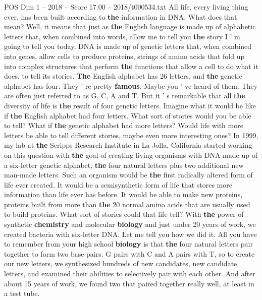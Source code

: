 \begin{textsample}{POS Dim 1 – 2018 – Score 17.00 – 2018/t000534.txt}  \label{ex:f1_pos_068}
All life, every living thing ever, has been built according to \textbf{the} information in DNA.
What does that mean?
Well, it means that just as \textbf{the} English language is made up of alphabetic letters that, when combined into words, allow me to tell you \textbf{the} story I ' m going to tell you today, DNA is made up of genetic letters that, when combined into genes, allow cells to produce proteins, strings of amino acids that fold up into complex structures that perform \textbf{the} functions that allow a cell to do what it does, to tell its stories. \textbf{The} English alphabet has 26 letters, and \textbf{the} genetic alphabet has four.
They ' re pretty \textbf{famous}.
Maybe you ' ve heard of them.
They are often just referred to as G, C, A and T.
But it ' s remarkable that all \textbf{the} diversity of life is \textbf{the} result of four genetic letters.
Imagine what it would be like if \textbf{the} English alphabet had four letters.
What sort of stories would you be able to tell?
What if \textbf{the} genetic alphabet had more letters?
Would life with more letters be able to tell different stories, maybe even more interesting ones?
In 1999, my lab at \textbf{the} Scripps Research Institute in La Jolla, California started working on this question with \textbf{the} goal of creating living organisms with DNA made up of a six-letter genetic alphabet, \textbf{the} four natural letters plus two additional new man-made letters.
Such an organism would be \textbf{the} first radically altered form of life ever created.
It would be a semisynthetic form of life that stores more information than life ever has before.
It would be able to make new proteins, proteins built from more than \textbf{the} 20 normal amino acids that are usually used to build proteins.
What sort of stories could that life tell?
With \textbf{the} power of synthetic \textbf{chemistry} and molecular \textbf{biology} and just under 20 years of work, we created bacteria with six-letter DNA.
Let me tell you how we did it.
All you have to remember from your high school \textbf{biology} is that \textbf{the} four natural letters pair together to form two base pairs.
G pairs with C and A pairs with T, so to create our new letters, we synthesized hundreds of new candidates, new candidate letters, and examined their abilities to selectively pair with each other.
And after about 15 years of work, we found two that paired together really well, at least in a test tube.

\end{textsample}
